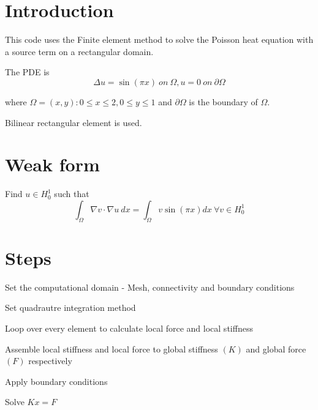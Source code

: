 \hypertarget{index_intro_sec}{}\section{Introduction}\label{index_intro_sec}
This code uses the Finite element method to solve the Poisson heat equation with a source term on a rectangular domain.

The P\-D\-E is \[ \Delta u = \sin(\pi x)\ on\ \Omega, u = 0\ on\ \partial\Omega \]

where $ \Omega = {(x,y):0 \leq x \leq 2,0 \leq y \leq 1}$ and $\partial\Omega$ is the boundary of $\Omega$.

Bilinear rectangular element is used.\hypertarget{index_install_sec}{}\section{Weak form}\label{index_install_sec}
Find $u\in H_{0}^{1}$ such that \[ \int_{\Omega}\nabla v\cdot\nabla u\ dx=\int_{\Omega}v\sin\left(\pi x\right)dx\ \forall v\in H_{0}^{1} \]\hypertarget{index_steps}{}\section{Steps}\label{index_steps}

\begin{DoxyEnumerate}
\item Set the computational domain -\/ Mesh, connectivity and boundary conditions
\item Set quadrautre integration method
\item Loop over every element to calculate local force and local stiffness
\item Assemble local stiffness and local force to global stiffness $(K)$ and global force $(F)$ respectively
\item Apply boundary conditions
\item Solve $Kx=F$ 
\end{DoxyEnumerate}